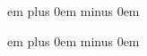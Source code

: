 \newskip\interwordspacetextnotes

\newskip\interwordspacetext

\newskip\bispace

\newskip\trispace

\newskip\punctuminclinatumshift

\newskip\beforepunctainclinatashift

\newskip\punctuminclinatumanddebilisshift

\newskip\punctuminclinatumdebilisshift

\newskip\spacebeforesmallbar

\newskip\spaceaftersmallbar

\newskip\spacebeforeminor

\newskip\spaceafterminor

\newskip\spacebeforemaior

\newskip\spaceaftermaior

\newskip\spacebeforefinalis

\newskip\spacebeforefinalfinalis

\newskip\spaceafterfinalis

\newskip\textbartextspace

\newskip\notebarspace

\newdimen\maximumspacewithoutdash

\newskip\afterclefnospace

\newskip\afterinitialshift
{} em plus 0em minus 0em

\newskip\beforeinitialshift
{} em plus 0em minus 0em

\def\setspaceafterinitial#1{%
\afterinitialshift=#1 %
\relax %
}

